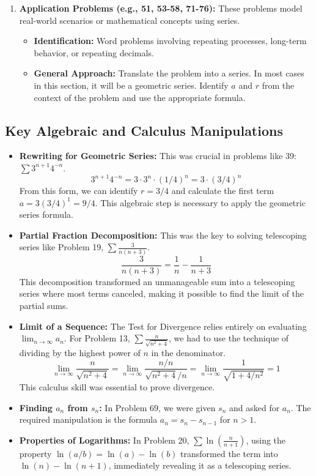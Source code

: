 \documentclass{article}
\begin{document}
\begin{enumerate}
\begin{itemize}
        \end{itemize}
     \item \textbf{Application Problems (e.g., 51, 53-58, 71-76):} These problems model real-world scenarios or mathematical concepts using series.
        \begin{itemize}
            \item \textbf{Identification:} Word problems involving repeating processes, long-term behavior, or repeating decimals.
            \item \textbf{General Approach:} Translate the problem into a series. In most cases in this section, it will be a geometric series. Identify $a$ and $r$ from the context of the problem and use the appropriate formula.
        \end{itemize}
\end{enumerate}

\subsection{Key Algebraic and Calculus Manipulations}
\begin{itemize}
    \item \textbf{Rewriting for Geometric Series:} This was crucial in problems like 39: $\sum 3^{n+1}4^{-n}$.
    \[ 3^{n+1}4^{-n} = 3 \cdot 3^n \cdot (1/4)^n = 3 \cdot (3/4)^n \]
    From this form, we can identify $r=3/4$ and calculate the first term $a = 3(3/4)^1 = 9/4$. This algebraic step is necessary to apply the geometric series formula.
    \item \textbf{Partial Fraction Decomposition:} This was the key to solving telescoping series like Problem 19, $\sum \frac{3}{n(n+3)}$.
    \[ \frac{3}{n(n+3)} = \frac{1}{n} - \frac{1}{n+3} \]
    This decomposition transformed an unmanageable sum into a telescoping series where most terms canceled, making it possible to find the limit of the partial sums.
    \item \textbf{Limit of a Sequence:} The Test for Divergence relies entirely on evaluating $\lim_{n \to \infty} a_n$. For Problem 13, $\sum \frac{n}{\sqrt{n^2+4}}$, we had to use the technique of dividing by the highest power of $n$ in the denominator.
    \[ \lim_{n \to \infty} \frac{n}{\sqrt{n^2+4}} = \lim_{n \to \infty} \frac{n/n}{\sqrt{n^2+4}/n} = \lim_{n \to \infty} \frac{1}{\sqrt{1+4/n^2}} = 1 \]
    This calculus skill was essential to prove divergence.
    \item \textbf{Finding $a_n$ from $s_n$:} In Problem 69, we were given $s_n$ and asked for $a_n$. The required manipulation is the formula $a_n = s_n - s_{n-1}$ for $n>1$.
    \item \textbf{Properties of Logarithms:} In Problem 20, $\sum \ln(\frac{n}{n+1})$, using the property $\ln(a/b) = \ln(a) - \ln(b)$ transformed the term into $\ln(n) - \ln(n+1)$, immediately revealing it as a telescoping series.
\end{itemize}
\end{document}
